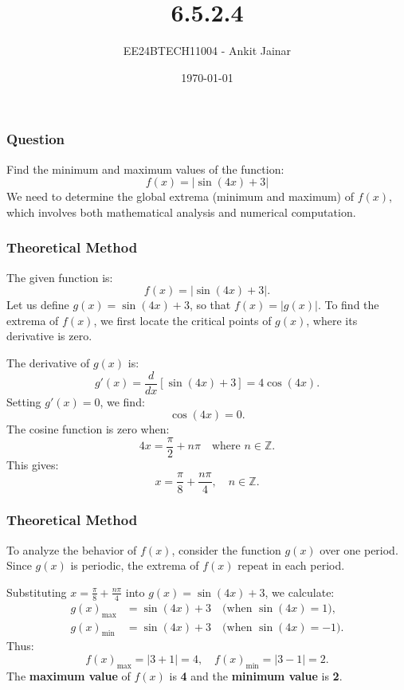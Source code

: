 \documentclass{beamer}
\title{6.5.2.4}
\author{EE24BTECH11004 - Ankit Jainar}
\date{\today}
\begin{document}
\frame{\titlepage}

\begin{frame}
\frametitle{Question}
Find the minimum and maximum values of the function:
\[
f(x) = |\sin(4x) + 3|
\]
We need to determine the global extrema (minimum and maximum) of \(f(x)\), which involves both mathematical analysis and numerical computation.
\end{frame}

\begin{frame}
\frametitle{Theoretical Method}
The given function is:
\[
f(x) = |\sin(4x) + 3|.
\]
Let us define \(g(x) = \sin(4x) + 3\), so that \(f(x) = |g(x)|\).  
To find the extrema of \(f(x)\), we first locate the critical points of \(g(x)\), where its derivative is zero.  
\newline

The derivative of \(g(x)\) is:
\[
g'(x) = \frac{d}{dx}[\sin(4x) + 3] = 4\cos(4x).
\]
Setting \(g'(x) = 0\), we find:
\[
\cos(4x) = 0.
\]
The cosine function is zero when:
\[
4x = \frac{\pi}{2} + n\pi \quad \text{where } n \in \mathbb{Z}.
\]
This gives:
\[
x = \frac{\pi}{8} + \frac{n\pi}{4}, \quad n \in \mathbb{Z}.
\]
\end{frame}

\begin{frame}
\frametitle{Theoretical Method}
To analyze the behavior of \(f(x)\), consider the function \(g(x)\) over one period.  
Since \(g(x)\) is periodic, the extrema of \(f(x)\) repeat in each period.

Substituting \(x = \frac{\pi}{8} + \frac{n\pi}{4}\) into \(g(x) = \sin(4x) + 3\), we calculate:
\begin{align*}
g(x)_{\text{max}} &= \sin(4x) + 3 \quad \text{(when \(\sin(4x) = 1\))}, \\
g(x)_{\text{min}} &= \sin(4x) + 3 \quad \text{(when \(\sin(4x) = -1\))}.
\end{align*}
Thus:
\[
f(x)_{\text{max}} = |3 + 1| = 4, \quad f(x)_{\text{min}} = |3 - 1| = 2.
\]
The \textbf{maximum value} of \(f(x)\) is \textbf{4} and the \textbf{minimum value} is \textbf{2}.
\end{frame}
\end{document}
